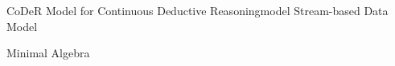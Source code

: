 \begin{nestedsection}{CoDeR Model for Continuous Deductive Reasoning}{model}
	Stream-based Data Model

	Minimal Algebra

\end{nestedsection}